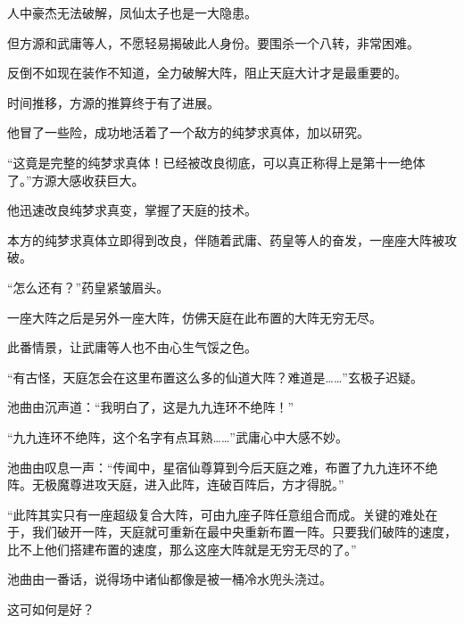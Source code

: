 \begin{this_body}
人中豪杰无法破解，凤仙太子也是一大隐患。

但方源和武庸等人，不愿轻易揭破此人身份。要围杀一个八转，非常困难。

反倒不如现在装作不知道，全力破解大阵，阻止天庭大计才是最重要的。

时间推移，方源的推算终于有了进展。

他冒了一些险，成功地活着了一个敌方的纯梦求真体，加以研究。

“这竟是完整的纯梦求真体！已经被改良彻底，可以真正称得上是第十一绝体了。”方源大感收获巨大。

他迅速改良纯梦求真变，掌握了天庭的技术。

本方的纯梦求真体立即得到改良，伴随着武庸、药皇等人的奋发，一座座大阵被攻破。

“怎么还有？”药皇紧皱眉头。

一座大阵之后是另外一座大阵，仿佛天庭在此布置的大阵无穷无尽。

此番情景，让武庸等人也不由心生气馁之色。

“有古怪，天庭怎会在这里布置这么多的仙道大阵？难道是……”玄极子迟疑。

池曲由沉声道：“我明白了，这是九九连环不绝阵！”

“九九连环不绝阵，这个名字有点耳熟……”武庸心中大感不妙。

池曲由叹息一声：“传闻中，星宿仙尊算到今后天庭之难，布置了九九连环不绝阵。无极魔尊进攻天庭，进入此阵，连破百阵后，方才得脱。”

“此阵其实只有一座超级复合大阵，可由九座子阵任意组合而成。关键的难处在于，我们破开一阵，天庭就可重新在最中央重新布置一阵。只要我们破阵的速度，比不上他们搭建布置的速度，那么这座大阵就是无穷无尽的了。”

池曲由一番话，说得场中诸仙都像是被一桶冷水兜头浇过。

这可如何是好？

\end{this_body}

